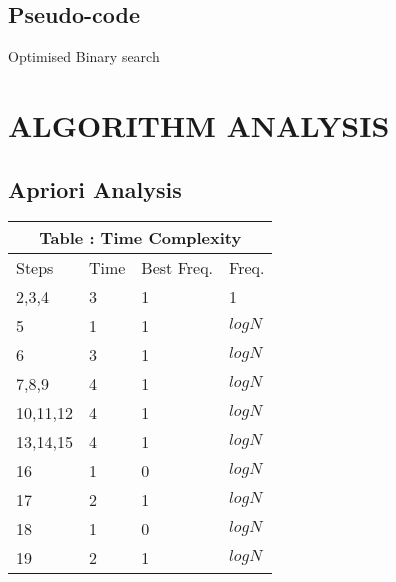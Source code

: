 \documentclass[conference]{IEEEtran}
\begin{document}
 \subsection{Pseudo-code}  
\begin{algorithm}[H] 
    \caption{Optimised Binary search}
    \DontPrintSemicolon
\end{algorithm}
\section{ALGORITHM ANALYSIS}

\subsection{Apriori Analysis}

\begin{tabular}{ |p{2cm}||p{1cm}|p{1cm}|p{2cm}|  }
 \hline
 \multicolumn{4}{|c|}{Table : Time Complexity} \\
 \hline
 Steps & Time &Best Freq. &Freq.\\
 \hline
  2,3,4 & 3 & 1 & 1\\
  \hline
  5 & 1 & 1 & $logN$\\
  \hline
  6 & 3 & 1 & $logN$\\
  \hline
  7,8,9 & 4 & 1 & $logN$\\
  \hline
  10,11,12 & 4 & 1 & $logN$\\
  \hline
  13,14,15 & 4 & 1 & $logN$\\
  \hline
  16 & 1 & 0 & $logN$\\
  \hline
  17 & 2 & 1 & $logN$\\
  \hline
  18 & 1 & 0 & $logN$\\
  \hline
  19 & 2 & 1 & $logN$\\
 \hline
\end{tabular}
\end{document}
